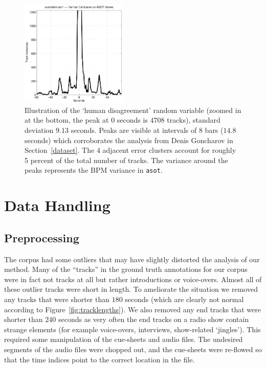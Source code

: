 \documentclass[twocolumn]{article}
\begin{document}
	\begin{figure}
		\centering
		\includegraphics[width=0.45\textwidth]{images/human_confusion}
		
		\caption{Illustration of the `human disagreement' random variable (zoomed in at the bottom, the peak at $0$ seconds is $4708$ tracks), standard deviation $9.13$ seconds. Peaks are visible at intervals of $8$ bars ($14.8$ seconds) which corroborates the analysis from Denis Goncharov in Section~\ref{dataset}. The $4$ adjacent error clusters account for roughly 5 percent of the total number of tracks. The variance around the peaks represents the BPM variance in \texttt{asot}. }
		\label{fig:human_muchconfuse}
	\end{figure} 
	
	\section{Data Handling}
	
	\subsection{Preprocessing}\label{proprocessing} %
	
	The corpus had some outliers that may have slightly distorted the analysis of our method. Many of the ``tracks'' in the ground truth annotations for our corpus were in fact not tracks at all but rather introductions or voice-overs. Almost all of these outlier tracks were short in length. To ameliorate the situation we removed any tracks that were shorter than $180$ seconds (which are clearly not normal according to Figure~\ref{fig:tracklengths}). We also removed any end tracks that were shorter than $240$ seconds as very often the end tracks on a radio show contain strange elements (for example voice-overs, interviews, show-related `jingles'). This required some manipulation of the cue-sheets and audio files. The undesired segments of the audio files were chopped out, and the cue-sheets were re-flowed so that the time indices point to the correct location in the file. 
	
\end{document}
